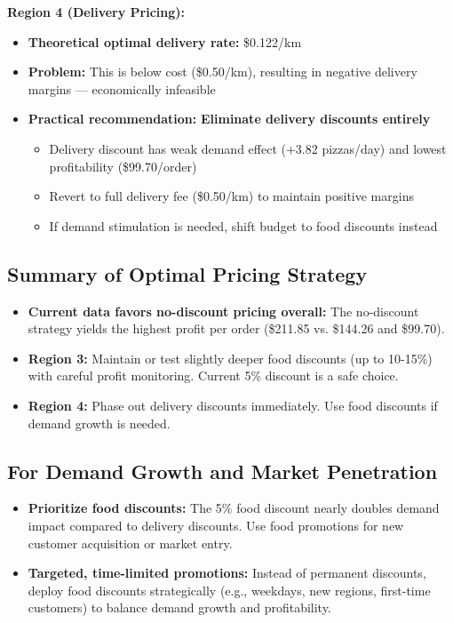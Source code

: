 \documentclass[12pt]{article}
\begin{document}
\textbf{Region 4 (Delivery Pricing):}
\begin{itemize}[nosep]
    \item \textbf{Theoretical optimal delivery rate:} \$0.122/km
    \item \textbf{Problem:} This is below cost (\$0.50/km), resulting in negative delivery margins — economically infeasible
    \item \textbf{Practical recommendation:} \textbf{Eliminate delivery discounts entirely}
    \begin{itemize}[nosep]
        \item Delivery discount has weak demand effect (+3.82 pizzas/day) and lowest profitability (\$99.70/order)
        \item Revert to full delivery fee (\$0.50/km) to maintain positive margins
        \item If demand stimulation is needed, shift budget to food discounts instead
    \end{itemize}
\end{itemize}

\subsection{Summary of Optimal Pricing Strategy}
\begin{itemize}[nosep]
    \item \textbf{Current data favors no-discount pricing overall:} The no-discount strategy yields the highest profit per order (\$211.85 vs. \$144.26 and \$99.70).
    \item \textbf{Region 3:} Maintain or test slightly deeper food discounts (up to 10-15\%) with careful profit monitoring. Current 5\% discount is a safe choice.
    \item \textbf{Region 4:} Phase out delivery discounts immediately. Use food discounts if demand growth is needed.
\end{itemize}

\subsection{For Demand Growth and Market Penetration}
\begin{itemize}[nosep]
    \item \textbf{Prioritize food discounts:} The 5\% food discount nearly doubles demand impact compared to delivery discounts. Use food promotions for new customer acquisition or market entry.
    \item \textbf{Targeted, time-limited promotions:} Instead of permanent discounts, deploy food discounts strategically (e.g., weekdays, new regions, first-time customers) to balance demand growth and profitability.
\end{itemize}
\end{document}
